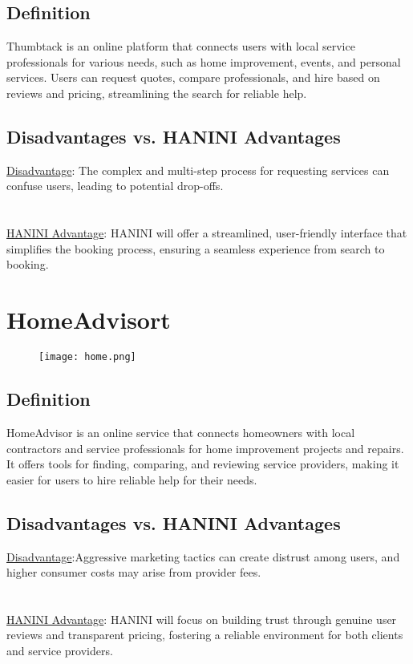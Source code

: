 \documentclass[12pt,a4paper]{report}
\begin{document}
\subsection*{Definition}
Thumbtack is an online platform that connects users with local service professionals for various needs, such as home improvement, events, and personal services. Users can request quotes, compare professionals, and hire based on reviews and pricing, streamlining the search for reliable help.
\subsection*{Disadvantages vs. HANINI Advantages}
\underline {Disadvantage}: The complex and multi-step process for requesting services can confuse users, leading to potential drop-offs.\\
\textbf{                      }\\
\textbf{                      }\\
\underline {HANINI Advantage}: HANINI will offer a streamlined, user-friendly interface that simplifies the booking process, ensuring a seamless experience from search to booking.


\section{HomeAdvisort}
\begin{figure}[ht]
    \begin{center}
        \texttt{[image: home.png]}
         
     \end{center}
\end{figure}
\subsection*{Definition}
HomeAdvisor is an online service that connects homeowners with local contractors and service professionals for home improvement projects and repairs. It offers tools for finding, comparing, and reviewing service providers, making it easier for users to hire reliable help for their needs.
\subsection*{Disadvantages vs. HANINI Advantages}
\underline {Disadvantage}:Aggressive marketing tactics can create distrust among users, and higher consumer costs may arise from provider fees.\\
\textbf{                      }\\
\textbf{                      }\\
\underline {HANINI Advantage}:  HANINI will focus on building trust through genuine user reviews and transparent pricing, fostering a reliable environment for both clients and service providers.
\end{document}
